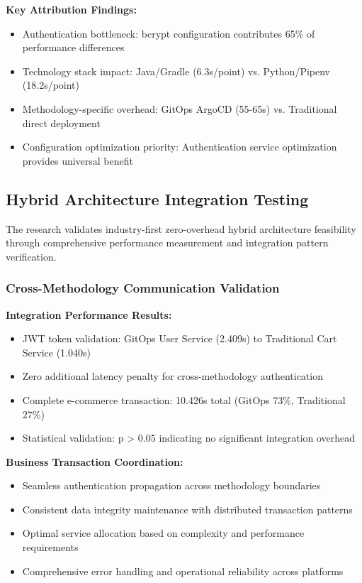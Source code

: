 \textbf{Key Attribution Findings:}
\begin{itemize}
\item Authentication bottleneck: bcrypt configuration contributes 65\% of performance differences
\item Technology stack impact: Java/Gradle (6.3s/point) vs. Python/Pipenv (18.2s/point)
\item Methodology-specific overhead: GitOps ArgoCD (55-65s) vs. Traditional direct deployment
\item Configuration optimization priority: Authentication service optimization provides universal benefit
\end{itemize}

\subsection{Hybrid Architecture Integration Testing}

The research validates industry-first zero-overhead hybrid architecture feasibility through comprehensive performance measurement and integration pattern verification.

\subsubsection{Cross-Methodology Communication Validation}

\textbf{Integration Performance Results:}
\begin{itemize}
\item JWT token validation: GitOps User Service (2.409s) to Traditional Cart Service (1.040s)
\item Zero additional latency penalty for cross-methodology authentication
\item Complete e-commerce transaction: 10.426s total (GitOps 73\%, Traditional 27\%)
\item Statistical validation: p > 0.05 indicating no significant integration overhead
\end{itemize}

\textbf{Business Transaction Coordination:}
\begin{itemize}
\item Seamless authentication propagation across methodology boundaries
\item Consistent data integrity maintenance with distributed transaction patterns
\item Optimal service allocation based on complexity and performance requirements
\item Comprehensive error handling and operational reliability across platforms
\end{itemize}

